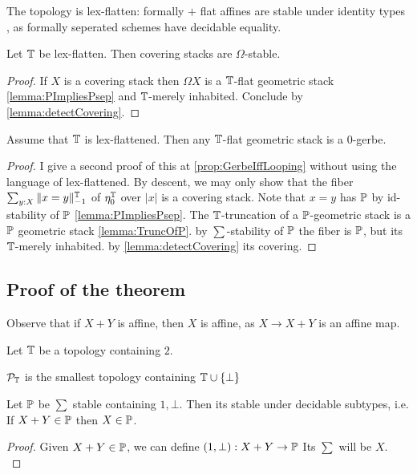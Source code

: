 \begin{example}
	The \etale topology is lex-flatten:
	formally \etale $+$ flat affines are stable under identity types , as formally \etale seperated schemes have decidable equality.  %
\end{example}

\begin{prop}{\label{prop:LexflattenOmegaStable}}
	Let $\mathbb{T}$ be lex-flatten. Then covering stacks are $\Omega$-stable. %
\end{prop}
\begin{proof}
	If $X$ is a covering stack then $\Omega X$ is a $\mathbb{T}$-flat geometric stack \ref{lemma:PImpliesPsep} and $\mathbb{T}$-merely inhabited. Conclude by  \ref{lemma:detectCovering}.
\end{proof}
\begin{lemma}{\label{lemma:TflatIs0-gerbe}}
	Assume that $\mathbb{T}$ is lex-flattened. Then any $\mathbb{T}$-flat geometric stack is a 0-gerbe.
\end{lemma}
\begin{proof}
	I give a second proof of this at \ref{prop:GerbeIffLooping} without using the language of lex-flattened.
	By descent, we may only show that the fiber $\sum_{y: X} \|x = y\|_{-1}^{\mathbb{T}}$ of $\eta_0^{\mathbb{T}}$ over $|x|$ is a covering stack. Note that $x = y$ has $\mathbb{P}$ by id-stability of $\mathbb{P}$ \ref{lemma:PImpliesPsep}. The $\mathbb{T}$-truncation of a $\mathbb{P}$-geometric stack is a $\mathbb{P}$ geometric stack \ref{lemma:TruncOfP}. by $\sum$-stability of $\mathbb{P}$ the fiber is $\mathbb{P}$, but its $\mathbb{T}$-merely inhabited. by \ref{lemma:detectCovering} its covering.
\end{proof}

\subsection{Proof of the theorem}
 Observe that if $X + Y$ is affine, then $X$ is affine, as $X \to X + Y$ is an affine map.

Let $\mathbb{T}$ be a topology containing $2$.%
\begin{definition}
	$\mathcal{P}_{\mathbb{T}}$ is the smallest topology containing $\mathbb{T} \cup \{\bot\}$
\end{definition}
\begin{lemma}{\label{lemma:SummandStable}}
	Let $\mathbb{P}$ be $\sum$ stable containing $1 , \bot$. Then its stable under decidable subtypes, i.e. If $X + Y \in \mathbb{P}$ then $X \in \mathbb{P}$.
\end{lemma}
\begin{proof}
	Given $X + Y \in \mathbb{P}$, we can define $(1, \bot) : X + Y \to \mathbb{P}$ Its $\sum$ will be $X$. \\
\end{proof}

